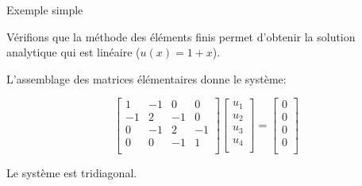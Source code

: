 \documentclass[
mode=present,    %
paper=a4paper,   %
orient=landscape,
display=slides,   %
size=10pt,     %
style=romain   %
]{powerdot}
\begin{document}
\begin{slide}[toc=]{Exemple simple}

Vérifions que la méthode des éléments finis permet d'obtenir la solution analytique qui est linéaire ($u(x) = 1+x$).

\bigskip

L'assemblage des matrices élémentaires donne le système:

\begin{equation*}
\begin{bmatrix}
        1 & -1 &  0  & 0    \\
        -1 & 2 &  -1 & 0    \\
        0 & -1 & 2   & -1    \\
       0 & 0 &  -1 & 1    \\
    \end{bmatrix}
     \begin{bmatrix}
        u_1    \\
        u_2    \\
        u_3    \\
       u_4    \\
    \end{bmatrix}
    =
     \begin{bmatrix}
        0    \\
        0    \\
        0    \\
       0    \\
    \end{bmatrix}
\end{equation*}

Le système est tridiagonal.


\end{slide}
\end{document}

